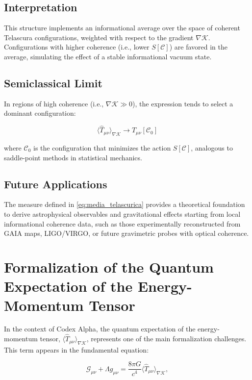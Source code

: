 \documentclass[12pt]{article}
\begin{document}
\subsection*{Interpretation}
This structure implements an informational average over the space of coherent Telascura configurations, weighted with respect to the gradient $\nabla \mathcal{K}$. Configurations with higher coherence (i.e., lower $S[\mathcal{C}]$) are favored in the average, simulating the effect of a stable informational vacuum state.

\subsection*{Semiclassical Limit}

In regions of high coherence (i.e., $\nabla \mathcal{K} \gg 0$), the expression tends to select a dominant configuration:

\begin{equation}
\langle \hat{T}_{\mu\nu} \rangle_{\nabla \mathcal{K}} \to T_{\mu\nu}[\mathcal{C}_0]
\end{equation}

where $\mathcal{C}_0$ is the configuration that minimizes the action $S[\mathcal{C}]$, analogous to saddle-point methods in statistical mechanics.

\subsection*{Future Applications}

The measure defined in \eqref{eq:media_telascurica} provides a theoretical foundation to derive astrophysical observables and gravitational effects starting from local informational coherence data, such as those experimentally reconstructed from GAIA maps, LIGO/VIRGO, or future gravimetric probes with optical coherence.

\section*{Formalization of the Quantum Expectation of the Energy-Momentum Tensor}

In the context of Codex Alpha, the quantum expectation of the energy-momentum tensor, $\langle \hat{T}_{\mu\nu} \rangle_{\nabla \mathcal{K}}$, represents one of the main formalization challenges. This term appears in the fundamental equation:

\begin{equation}
\mathcal{G}_{\mu\nu} + \Lambda g_{\mu\nu} = \frac{8\pi G}{c^4} \langle \hat{T}_{\mu\nu} \rangle_{\nabla \mathcal{K}},
\end{equation}
\end{document}
